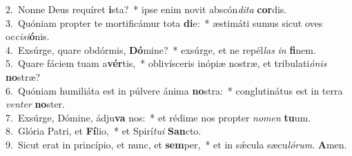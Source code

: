 {2.~}Nonne Deus requíret \textbf{i}sta?~* ipse enim novit abscón\textit{di}\textit{ta} \textbf{cor}dis.\\
{3.~}Quóniam propter te mortificámur tota \textbf{di}e:~* æstimáti sumus sicut oves oc\textit{ci}\textit{si}\textbf{ó}nis.\\
{4.~}Exsúrge, quare obdórmis, \textbf{Dó}mine?~* exsúrge, et ne repél\textit{las} \textit{in} \textbf{fi}nem.\\
{5.~}Quare fáciem tuam a\textbf{vér}tis,~* oblivísceris inópiæ nostræ, et tribulati\textit{ó}\textit{nis} \textbf{no}stræ?\\
{6.~}Quóniam humiliáta est in púlvere ánima \textbf{no}stra:~* conglutinátus est in terra \textit{ven}\textit{ter} \textbf{no}ster.\\
{7.~}Exsúrge, Dómine, ádju\textbf{va} nos:~* et rédime nos propter \textit{no}\textit{men} \textbf{tu}um.\\
{8.~}Glória Patri, et \textbf{Fí}lio,~* et Spirí\textit{tu}\textit{i} \textbf{San}cto.\\
{9.~}Sicut erat in princípio, et nunc, et \textbf{sem}per,~* et in sǽcula sæcu\textit{ló}\textit{rum}. \textbf{A}men.\\
